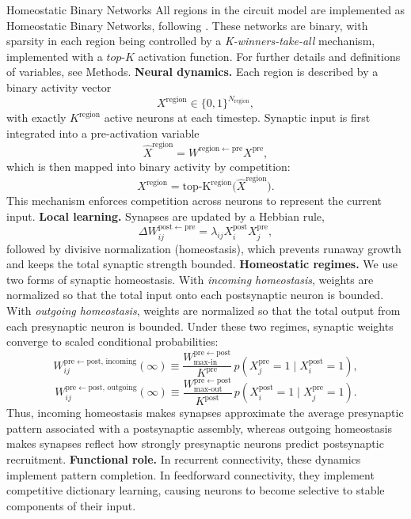 \documentclass{article}
\begin{document}
\begin{technicalbox}{Homeostatic Binary Networks}
All regions in the circuit model are implemented as Homeostatic Binary Networks, following . These networks are binary, with sparsity in each region being controlled by a \textit{K-winners-take-all} mechanism, implemented with a $top$-$K$ activation function. For further details and definitions of variables, see Methods.
\newline\newline
\textbf{Neural dynamics.} Each region is described by a binary activity vector
\[
X^\mathrm{region}\in\{0,1\}^{N_\mathrm{region}},
\]
with exactly $K^\mathrm{region}$ active neurons at each timestep. Synaptic input is first integrated into a pre-activation variable
\[
\hat{X}^\mathrm{region}
=
W^{\mathrm{region}\leftarrow\mathrm{pre}}X^\mathrm{pre},
\]
which is then mapped into binary activity by competition:
\[
X^\mathrm{region}
=
\operatorname{top\text{-}K^\mathrm{region}}
\big(\hat{X}^\mathrm{region}\big).
\]
This mechanism enforces competition across neurons to represent the current input.
\newline\newline
\textbf{Local learning.} Synapses are updated by a Hebbian rule,
\[
\Delta W_{ij}^{\mathrm{post}\leftarrow\mathrm{pre}}
=
\lambda_{ij}X_i^\mathrm{post}X_j^\mathrm{pre},
\]
followed by divisive normalization (homeostasis), which prevents runaway growth and keeps the total synaptic strength bounded.
\newline\newline
\textbf{Homeostatic regimes.} We use two forms of synaptic homeostasis. With \textit{incoming homeostasis}, weights are normalized so that the total input onto each postsynaptic neuron is bounded. With \textit{outgoing homeostasis}, weights are normalized so that the total output from each presynaptic neuron is bounded. Under these two regimes, synaptic weights converge to scaled conditional probabilities:
\[
W_{ij}^{\mathrm{pre}\leftarrow\mathrm{post},\,\mathrm{incoming}}(\infty)
\equiv
\frac{W_{\mathrm{max\text{-}in}}^{\mathrm{pre}\leftarrow\mathrm{post}}}{K^\mathrm{pre}}
\,p(X_j^\mathrm{pre}=1\mid X_i^\mathrm{post}=1),
\]
\[
W_{ij}^{\mathrm{pre}\leftarrow\mathrm{post},\,\mathrm{outgoing}}(\infty)
\equiv
\frac{W_{\mathrm{max\text{-}out}}^{\mathrm{pre}\leftarrow\mathrm{post}}}{K^\mathrm{post}}
\,p(X_i^\mathrm{post}=1\mid X_j^\mathrm{pre}=1).
\]
Thus, incoming homeostasis makes synapses approximate the average presynaptic pattern associated with a postsynaptic assembly, whereas outgoing homeostasis makes synapses reflect how strongly presynaptic neurons predict postsynaptic recruitment.
\newline\newline
\textbf{Functional role.} In recurrent connectivity, these dynamics implement pattern completion. In feedforward connectivity, they implement competitive dictionary learning, causing neurons to become selective to stable components of their input.
\end{technicalbox}
\end{document}
